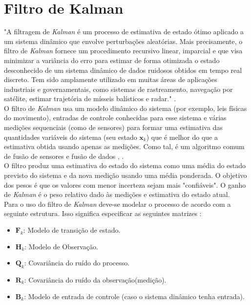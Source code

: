 \section{Filtro de Kalman}
\label{sec:kalman}
"A filtragem de \emph{Kalman} é um processo de estimativa de estado ótimo aplicado a um sistema dinâmico que envolve perturbações aleatórias. Mais precisamente, o filtro de \emph{Kalman} fornece um  procedimento recursivo linear, imparcial e que visa minimizar a variância do erro para estimar de forma otimizada o estado desconhecido de um sistema dinâmico de dados ruidosos obtidos em tempo real discreto. Tem sido amplamente utilizado em muitas áreas de aplicações industriais e governamentais, como sistemas de rastreamento, navegação por satélite, estimar trajetória de mísseis balísticos e radar." \cite{kalman:book}.\\

O filtro de \emph{Kalman} usa um modelo dinâmico do sistema (por exemplo, leis físicas do movimento), entradas de controle conhecidas para esse sistema e várias medições sequenciais (como de sensores) para formar uma estimativa das quantidades variáveis do sistema (seu estado $\textbf{x}_k$) que é melhor do que a estimativa obtida usando apenas as medições. Como tal, é um algoritmo comum de fusão de sensores e fusão de dados \cite{kalman:wiki}, \cite{Kalman:ofid}.\\

O filtro produz uma estimativa do estado do sistema como uma média do estado previsto do sistema e da nova medição usando uma média ponderada. O objetivo dos pesos é que os valores com menor incerteza sejam mais "confiáveis". O ganho de \emph{Kalman} é o peso relativo dado às medições e estimativa do estado atual.\\

Para o uso do filtro de \emph{Kalman} deve-se modelar o processo de acordo com a seguinte estrutura. Isso significa especificar as seguintes matrizes \cite{kalman:book}:

\begin{itemize}
    \item $\textbf{F}_k$: Modelo de transição de estado.
    \item $\textbf{H}_k$: Modelo de Observação.
    \item $\textbf{Q}_k$: Covariância do ruído do processo.
    \item $\textbf{R}_k$: Covariância do ruído da observação(medição).
    \item $\textbf{B}_k$: Modelo de entrada de controle (caso o sistema dinâmico tenha entrada). 
\end{itemize}


